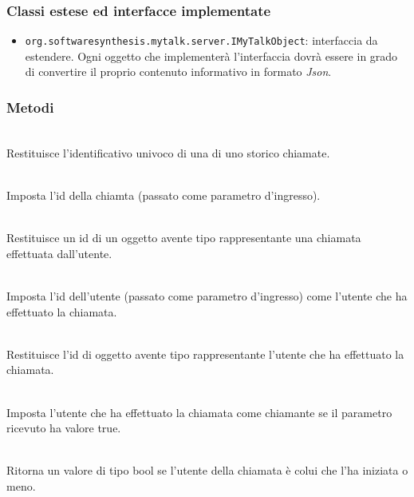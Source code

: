 \subsubsection*{Classi estese ed interfacce implementate}
\begin{itemize}
	\item \texttt{org.softwaresynthesis.mytalk.server.IMyTalkObject}: interfaccia da estendere. Ogni oggetto che implementerà l'interfaccia  dovrà essere in grado di convertire il proprio contenuto informativo in formato \textit{Json}.
\end{itemize}

\subsubsection*{Metodi}
\begin{description}
	\item{}\\
	Restituisce l'identificativo univoco di una  di uno storico chiamate.
	
	\item{}\\
	Imposta l'id della chiamta  (passato come parametro d'ingresso).
	\item{}\\
	Restituisce un id di un oggetto avente tipo  rappresentante una chiamata effettuata dall'utente.
	
	\item{}\\
	Imposta l'id dell'utente  (passato come parametro d'ingresso) come l'utente che ha effettuato la chiamata.
	\item{}\\
	Restituisce l'id di oggetto avente tipo  rappresentante l'utente che ha effettuato la chiamata.
	
	\item{}\\
	Imposta l'utente che ha effettuato la chiamata come chiamante se il parametro ricevuto ha valore true.
	\item{}\\
	Ritorna un valore di tipo bool se l'utente della chiamata è colui che l'ha iniziata o meno.
\end{description}




